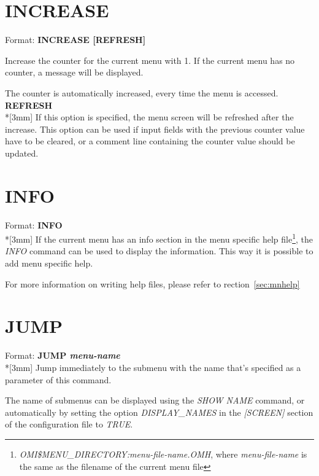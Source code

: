 \documentclass[a4paper]{book}
\renewcommand{\indent}{\hspace*{5mm}}
\begin{document}
\section{INCREASE}
\label{subsec:increase}

\indent Format: \textbf{INCREASE [REFRESH]}

\noindent Increase the counter for the current menu with 1. If the current menu has no 
counter, a message will be displayed.

The counter is automatically increased, every time the menu is accessed.\\[3mm]
\textbf{REFRESH}\\*[3mm]
If this option is specified, the menu screen will be refreshed after the 
increase. This option can be used if input fields with the previous counter 
value have to be cleared, or a comment line containing the counter value 
should be updated.

\section{INFO}
\label{subsec:cmdinfo}

\indent Format: \textbf{INFO}\\*[3mm]
If the current menu has an info section in the menu specific help
file\footnote{ \textsl{OMI\$MENU\_DIRECTORY:\textit{menu-file-name}.OMH}, 
where \textit{menu-file-name} is the same as the filename of the current menu file}, the
\textsl{INFO} command can be used to display the information. This way it is possible to add menu specific help.

For more information on writing help files, please refer to rection~\ref{sec:mnhelp}

\section{JUMP}
\label{subsec:mylabel16}

\indent Format: \textbf{JUMP \textit{menu-name}}\dag\\*[3mm]
Jump immediately to the submenu with the name that's specified as a 
parameter of this command.

The name of submenus can be displayed using the
\textsl{SHOW NAME}
command, or automatically by setting the option \textsl{DISPLAY{\_}NAMES} in the
\textsl{[SCREEN]}
section of the configuration file to \textsl{TRUE}.
\end{document}
